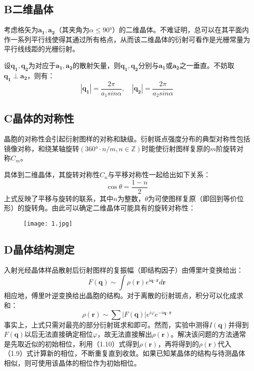 \documentclass{ctexart}
\begin{document}
\subsection*{B\quad 二维晶体}
考虑格矢为$\bm{a_1},\bm{a_2}$（其夹角为$\alpha\leqslant 90°$）的二维晶体。不难证明，总可以在其平面内作一系列平行线使得其通过所有格点，从而该二维晶体的衍射可看作是光栅常量为平行线线距的光栅衍射。

设$\bm{q_1},\bm{q_2}$为对应于$\bm{a_1},\bm{a_2}$的散射矢量，则$\bm{q_1},\bm{q_2}$分别与$\bm{a_1}$或$\bm{a_2}$之一垂直。不妨取$\bm{q_1}\perp\bm{a_2}$，则有：
\begin{equation}
  |\bm{q_1}|=\frac{2\pi}{a_1sin\alpha},\quad |\bm{q_2}|=\frac{2\pi}{a_2sin\alpha}
\end{equation}
\subsection*{C\quad 晶体的对称性}
晶胞的对称性会引起衍射图样的对称和缺级。衍射斑点强度分布的典型对称性包括镜像对称，和绕某轴旋转$(360°\cdot n/m, n\in \mathbb{Z})$时能使衍射图样复原的$m$阶旋转对称$C_m$。

具体到二维晶体，其旋转对称性$C_n$与平移对称性一起给出如下关系：
\begin{equation}
  \cos{\theta}=\frac{1-n}{2}
\end{equation}
上式反映了平移与旋转的联系，其中$n$为整数，$\theta$为可使图样复原（即回到等价位形）的旋转角。由此可以确定二维晶体可能具有的旋转对称性：
\begin{figure}[htbp]
  \centering
  \texttt{[image: 1.jpg]}
\end{figure}
\subsection*{D\quad 晶体结构测定}
入射光经晶体样品散射后衍射图样的复振幅（即结构因子）由傅里叶变换给出：
\begin{equation}
  F(\bm{q})\sim \int \rho(\bm{r})e^{i\bm{q}\cdot \bm{r}}d\bm{r}
\end{equation}
相应地，傅里叶逆变换给出晶胞的结构。对于离散的衍射斑点，积分可以化成求和：
\begin{equation}
  \rho(\bm{r})\sim \sum|F(\bm{q})|e^{i\varphi} e^{-i\bm{q}\cdot \bm{r}}
\end{equation}
事实上，上式只需对最亮的部分衍射斑求和即可。然而，实验中测得$I(\bm{q})$并得到$F(\bm{q})$以后无法直接确定相位$\varphi$，故无法直接解出$\rho(\bm{r})$。解决该问题的方法通常是先取近似的初始相位，利用（1.10）式得到$\rho(\bm{r})$，再将得到的$\rho(\bm{r})$代入（1.9）式计算新的相位，不断重复直到收敛。如果已知某晶体的结构与待测晶体相似，则可使用该晶体的相位作为初始相位。
\end{document}
